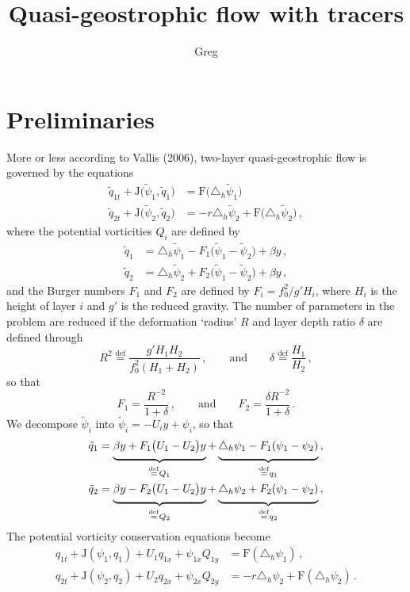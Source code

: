 \documentclass[12pt, oneside]{article}
\newcommand*\mystrut[1]{\vrule width0pt height0pt depth#1\relax}
\newcommand{\com}{\, ,}
\newcommand{\per}{\, .}
\newcommand{\defn}{\ensuremath{\stackrel{\mathrm{def}}{=}}}
\newcommand{\beq}{\begin{equation}}
\newcommand{\eeq}{\end{equation}}
\newcommand{\hlap}{\triangle_h}
\newcommand{\J}{\mathrm{J}}
\newcommand{\friction}{\mathrm{F}}
\newcommand{\q}{\tilde q}
\newcommand{\qpsi}{\tilde \psi}
\begin{document}
\title{\vspace{-4ex} Quasi-geostrophic flow with tracers}
\author{Greg}
\date{} \maketitle \vspace{-4ex}

\section{Preliminaries}

More or less according to Vallis (2006), two-layer quasi-geostrophic flow is governed by the equations
\begin{align}
\q_{1t} + \J \big ( \qpsi_1, \q_1 \big ) &= \friction \big ( \hlap \qpsi_1 \big ) \\
\q_{2t} + \J \big ( \qpsi_2, \q_2 \big ) &= -r \hlap \qpsi_2 + \friction  \big( \hlap \qpsi_2 \big ) \com 
\end{align}
where the potential vorticities $Q_i$ are defined by
\begin{align}
\q_{1} &= \hlap \qpsi_1 - F_1 \big ( \qpsi_1 - \qpsi_2 \big ) + \beta y \com \\
\q_2 &= \hlap \qpsi_2 + F_2 \big ( \qpsi_1 - \qpsi_2 \big ) + \beta y \com
\end{align}
and the Burger numbers $F_1$ and $F_2$ are defined by $F_i = f_0^2 / g' H_i$, where $H_i$ is the height of layer $i$ and $g'$ is the reduced gravity. The number of parameters in the problem are reduced if the deformation `radius' $R$ and layer depth ratio $\delta$ are defined through
\beq  
R^2 \defn \frac{g' H_1 H_2}{f_0^2 \left ( H_1 + H_2 \right )} \com \qquad \text{and} \qquad \delta \defn \frac{H_1}{H_2} \com
\eeq
so that 
\beq
F_1 = \frac{R^{-2}}{1 + \delta} \com \qquad \text{and} \qquad F_2 = \frac{\delta R^{-2}}{1 + \delta} \per
\eeq
We decompose $\qpsi_i$ into $\qpsi_i = - U_i y + \psi_i$, so that
\begin{align}
\q_1 &= \underbrace{\mystrut{1.4ex}  \beta y + F_1 \big ( U_1 - U_2 \big )y}_{\defn Q_1} + \underbrace{\mystrut{1.4ex} \hlap \psi_1 - F_1 ( \psi_1 - \psi_2 )}_{\defn q_1} \com \\
\q_2 &= \underbrace{\mystrut{1.4ex}  \beta y - F_2 \big ( U_1 - U_2 \big )y}_{\defn Q_2} + \underbrace{\mystrut{1.4ex} \hlap \psi_2 + F_2 ( \psi_1 - \psi_2 )}_{\defn q_2} \com
\end{align}
The potential vorticity conservation equations become
\begin{align}
q_{1t} + \J \left( \psi_1, q_1 \right ) + U_1 q_{1x} + \psi_{1x} Q_{1y} &= \friction \left ( \hlap \psi_1 \right) \com \\
 q_{2t} + \J \left( \psi_2, q_2 \right ) + U_2 q_{2x} + \psi_{2x} Q_{2y} &= - r \hlap \psi_2 + \friction \left ( \hlap \psi_2 \right) \per
\end{align}
\end{document}
